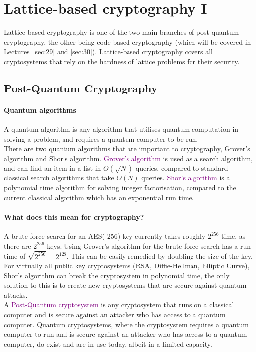 \documentclass[a4paper, 11pt, openany]{book}
\numberwithin{equation}{section}
\theoremstyle{plain}
\theoremstyle{definition}
\newcommand{\Define}[1]{\textcolor{purple}{#1}}
\begin{document}



\section{Lattice-based cryptography I}
\label{sec:19}
Lattice-based cryptography is one of the two main branches of post-quantum cryptography, the other being code-based cryptography (which will be covered in Lectures~\ref{sec:29} and \ref{sec:30}). Lattice-based cryptography covers all cryptosystems that rely on the hardness of lattice problems for their security.

\subsection{Post-Quantum Cryptography}

\paragraph{Quantum algorithms}
A quantum algorithm is any algorithm that utilises quantum computation in solving a problem, and requires a quantum computer to be run. 
\\
There are two quantum algorithms that are important to cryptography, Grover's algorithm and Shor's algorithm. \Define{Grover's algorithm} is used as a search algorithm, and can find an item in a list in $O(\sqrt{N})$ queries, compared to standard classical search algorithms that take $O(N)$ queries. \Define{Shor's algorithm} is a polynomial time algorithm for solving integer factorisation, compared to the current classical algorithm which has an exponential run time.
\paragraph{What does this mean for cryptography?}
A brute force search for an AES(-256) key currently takes roughly $2^{256}$ time, as there are $2^{256}$ keys. Using Grover's algorithm for the brute force search has a run time of $\sqrt{2^{256}} = 2^{128}$. This can be easily remedied by doubling the size of the key. For virtually all public key cryptosystems (RSA, Diffie-Hellman, Elliptic Curve), Shor's algorithm can break the cryptosystem in polynomial time, the only solution to this is to create new cryptosystems that are secure against quantum attacks.
\\
A \Define{Post-Quantum cryptosystem} is any cryptosystem that runs on a classical computer and is secure against an attacker who has access to a quantum computer.
Quantum cryptosystems, where the cryptosystem requires a quantum computer to run and is secure against an attacker who has access to a quantum computer, do exist and are in use today, albeit in a limited capacity. 
\end{document}
